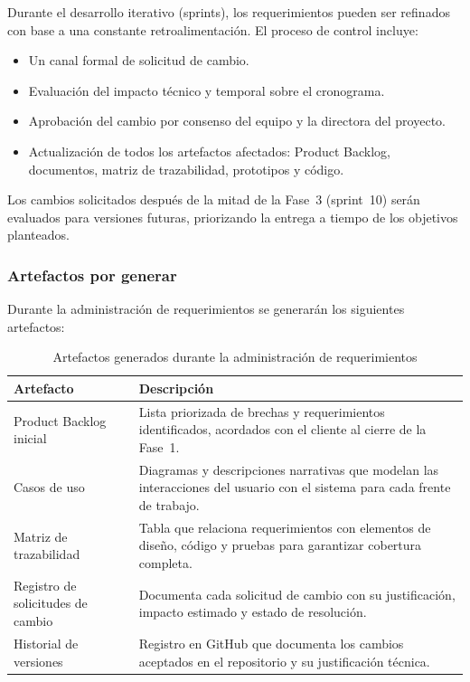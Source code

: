 \documentclass{article}
\begin{document}
Durante el desarrollo iterativo (sprints), los requerimientos pueden ser refinados con base a una constante retroalimentación. El proceso de control incluye:

\begin{itemize}
    \item Un canal formal de solicitud de cambio.
    \item Evaluación del impacto técnico y temporal sobre el cronograma.
    \item Aprobación del cambio por consenso del equipo y la directora del proyecto.
    \item Actualización de todos los artefactos afectados: Product Backlog,
          documentos, matriz de trazabilidad, prototipos y código.
\end{itemize}

Los cambios solicitados después de la mitad de la Fase~3 (sprint~10) serán
evaluados para versiones futuras, priorizando la entrega a tiempo de los
objetivos planteados.

\subsubsection*{Artefactos por generar}

Durante la administración de requerimientos se generarán los siguientes
artefactos:

\begin{table}[!ht]
\centering
\small
\begin{tabular}{|p{4cm}|p{10cm}|}
\hline
\textbf{Artefacto} & \textbf{Descripción} \\ \hline

Product Backlog inicial & Lista priorizada de brechas y requerimientos identificados, acordados con el cliente al cierre de la Fase~1. \\ \hline

Casos de uso & Diagramas y descripciones narrativas que modelan las interacciones del usuario con el sistema para cada frente de trabajo. \\ \hline

Matriz de trazabilidad & Tabla que relaciona requerimientos con elementos de diseño, código y pruebas para garantizar cobertura completa. \\ \hline

Registro de solicitudes de cambio & Documenta cada solicitud de cambio con su justificación, impacto estimado y estado de resolución. \\ \hline

Historial de versiones & Registro en GitHub que documenta los cambios aceptados en el repositorio y su justificación técnica. \\ \hline

\end{tabular}
\caption{Artefactos generados durante la administración de requerimientos}
\label{tab:artefactos_requerimientos}
\end{table}
\end{document}
